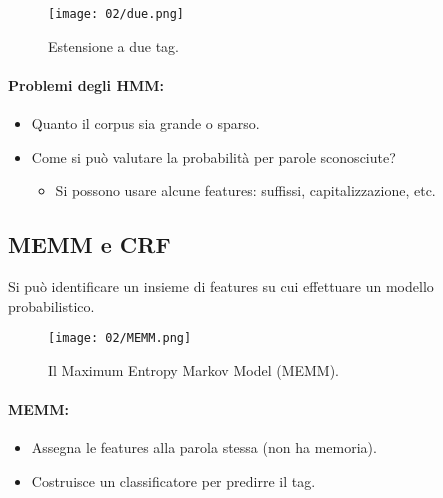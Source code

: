 \begin{figure}[h]
    \centering
    \texttt{[image: 02/due.png]}
    \caption{Estensione a due tag.}
\end{figure}



\paragraph{Problemi degli HMM:}

\begin{itemize}
  \item Quanto il corpus sia grande o sparso.
  \item Come si può valutare la probabilità per parole sconosciute?
    \begin{itemize}
      \item Si possono usare alcune features: suffissi, capitalizzazione, etc.
    \end{itemize}
\end{itemize}

\subsection{MEMM e CRF}

Si può identificare un insieme di features su cui effettuare un modello probabilistico.

\begin{figure}[h]
    \centering
    \texttt{[image: 02/MEMM.png]}
    \caption{Il Maximum Entropy Markov Model (MEMM).}
\end{figure}

\paragraph{MEMM:}

\begin{itemize}
  \item Assegna le features alla parola stessa (non ha memoria). 
  \item Costruisce un classificatore per predirre il tag.
\end{itemize}

